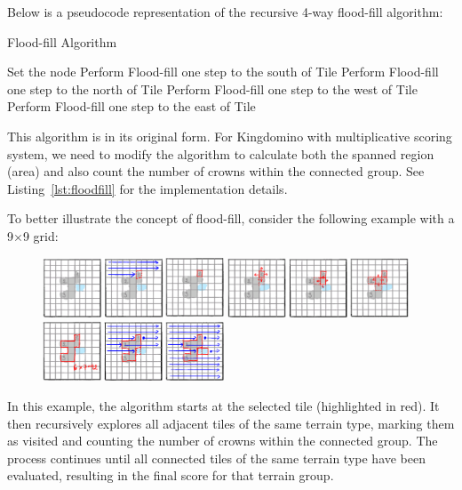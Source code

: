 \documentclass[conference]{IEEEtran}
\begin{document}
Below is a pseudocode representation of the recursive 4-way flood-fill
algorithm:

\begin{algorithm}[htbp]
    \caption{Flood-fill Algorithm}
    Set the node\;
    Perform Flood-fill one step to the south of Tile\;
    Perform Flood-fill one step to the north of Tile\;
    Perform Flood-fill one step to the west of Tile\;
    Perform Flood-fill one step to the east of Tile\;
    \Return\;
\end{algorithm}

This algorithm is in its original form. For Kingdomino with multiplicative
scoring system, we need to modify the algorithm to calculate both the spanned
region (area) and also count the number of crowns within the connected group.
See Listing~\ref{lst:floodfill} for the implementation details.

To better illustrate the concept of flood-fill, consider the following example
with a 9$\times$9 grid:

\begin{figure}[htbp]
    \centerline{\includegraphics[width=0.48\textwidth]{assets/floodfill-start.png}}
    \centerline{\includegraphics[width=0.48\textwidth]{assets/floodfill-detected.png}}
    \centerline{\includegraphics[width=0.48\textwidth]{assets/floodfill-continue.png}}
\end{figure}

In this example, the algorithm starts at the selected tile (highlighted in
red). It then recursively explores all adjacent tiles of the same terrain type,
marking them as visited and counting the number of crowns within the connected
group. The process continues until all connected tiles of the same terrain type
have been evaluated, resulting in the final score for that terrain group.
\end{document}

